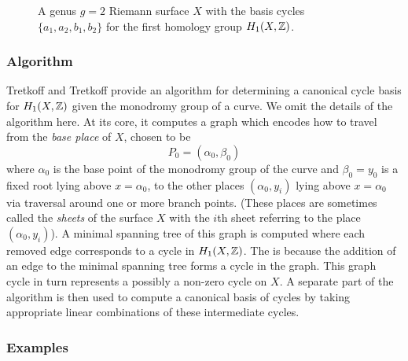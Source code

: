\begin{figure}
  \caption{A genus $g=2$ Riemann surface $X$ with the basis cycles
    $\{a_1,a_2,b_1,b_2\}$ for the first homology group $H_1(X,\operatorname{\mathbb{Z}})$.}
  \label{fig: cycle-basis}
\end{figure}


%
\subsubsection*{Algorithm}
%

Tretkoff and Tretkoff \cite{TretkoffTretkoff84} provide an algorithm for
determining a canonical cycle basis for $H_1(X,\operatorname{\mathbb{Z}})$ given the monodromy group
of a curve. We omit the details of the algorithm here. At its core, it computes
a graph which encodes how to travel from the {\it base place} of $X$, chosen to
be
\[
  P_0 = (\alpha_0, \beta_0)
\]
where $\alpha_0$ is the base point of the monodromy group of the curve and
$\beta_0 = y_0$ is a fixed root lying above $x = \alpha_0$, to the other places
$(\alpha_0, y_i)$ lying above $x = \alpha_0$ via traversal around one or more
branch points. (These places are sometimes called the {\it sheets} of the
surface $X$ with the $i$th sheet referring to the place $(\alpha_0,y_i)$). A
minimal spanning tree of this graph is computed where each removed edge
corresponds to a cycle in $H_1(X,\operatorname{\mathbb{Z}})$. The is because the addition of an edge
to the minimal spanning tree forms a cycle in the graph. This graph cycle in
turn represents a possibly a non-zero cycle on $X$. A separate part of the
algorithm is then used to compute a canonical basis of cycles by taking
appropriate linear combinations of these intermediate cycles.

%
\subsubsection*{Examples}
%

